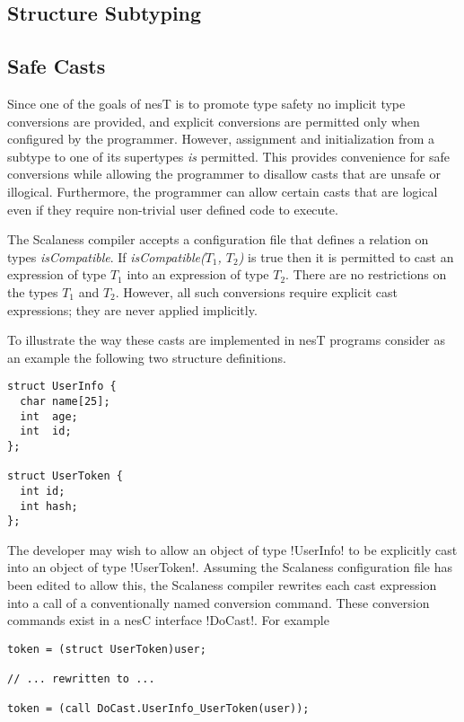 \subsection{Structure Subtyping}
\label{section-structure-subtyping}


\subsection{Safe Casts}
\label{section-safe-casts}

Since one of the goals of nesT is to promote type safety no implicit type conversions are
provided, and explicit conversions are permitted only when configured by the programmer.
However, assignment and initialization from a subtype to one of its supertypes \emph{is}
permitted. This provides convenience for safe conversions while allowing the programmer to
disallow casts that are unsafe or illogical. Furthermore, the programmer can allow certain casts
that are logical even if they require non-trivial user defined code to execute.

The Scalaness compiler accepts a configuration file that defines a relation on types
\textit{isCompatible}. If \textit{isCompatible($T_1$, $T_2$)} is true then it is permitted to
cast an expression of type $T_1$ into an expression of type $T_2$. There are no restrictions on
the types $T_1$ and $T_2$. However, all such conversions require explicit cast expressions; they
are never applied implicitly.

To illustrate the way these casts are implemented in nesT programs consider as an example the
following two structure definitions.

\singlespace
\begin{lstlisting}[language=nesC]
struct UserInfo {
  char name[25];
  int  age;
  int  id;
};

struct UserToken {
  int id;
  int hash;
};
\end{lstlisting}
\primaryspacing

The developer may wish to allow an object of type !UserInfo! to be explicitly cast into an
object of type !UserToken!. Assuming the Scalaness configuration file has been edited to allow
this, the Scalaness compiler rewrites each cast expression into a call of a conventionally named
conversion command. These conversion commands exist in a nesC interface !DoCast!. For example

\singlespace
\begin{lstlisting}[language=nesC]
token = (struct UserToken)user;

// ... rewritten to ...

token = (call DoCast.UserInfo_UserToken(user));
\end{lstlisting}
\primaryspacing

